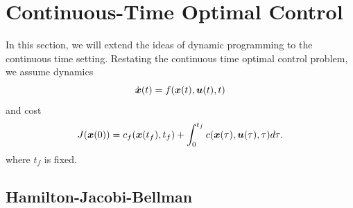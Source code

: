 


\section{Continuous-Time Optimal Control}


In this section, we will extend the ideas of dynamic programming to the continuous time setting. Restating the continuous time optimal control problem, we assume dynamics
\begin{equation}
    \dot{\bm{x}}(t) = f(\bm{x}(t),\bm{u}(t),t)
\end{equation}
and cost
\begin{equation}
    J(\bm{x}(0)) = c_f(\bm{x}(t_f),t_f) + \int_0^{t_f} c(\bm{x}(\tau),\bm{u}(\tau),\tau) d\tau.
\end{equation}
where $t_f$ is fixed. 


\subsection{Hamilton-Jacobi-Bellman}

